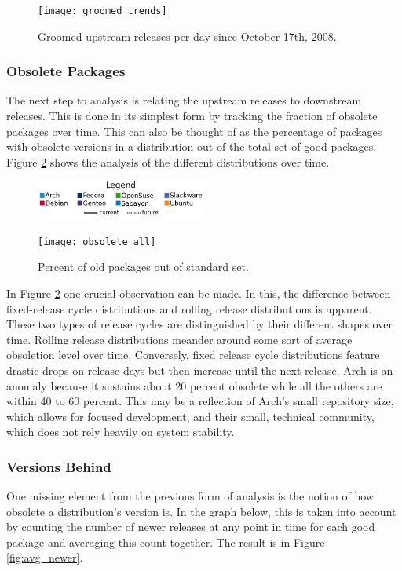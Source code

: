 \documentclass[letterpaper,10pt]{article}
\begin{document}
\begin{figure}[htbp]
\texttt{[image: groomed\_trends]}
\caption{Groomed upstream releases per day since October 17th, 2008.}
\label{fig:groomed_upstream}
\end{figure}

\subsubsection{Obsolete Packages}
The next step to analysis is relating the upstream releases to downstream releases.  This is done in its simplest form by tracking the fraction of obsolete packages over time.  This can also be thought of as the percentage of packages with obsolete versions in a distribution out of the total set of good packages.  Figure \ref{fig:percent_obs} shows the analysis of the different distributions over time.

\begin{figure}[htbp!]
\begin{center}
\includegraphics[width=0.5\textwidth]{legend2}
\end{center}
\texttt{[image: obsolete\_all]}
\caption{Percent of old packages out of standard set.}
\label{fig:percent_obs}
\end{figure}

In Figure \ref{fig:percent_obs} one crucial observation can be made.  In this, the difference between fixed-release cycle distributions and rolling release distributions is apparent.  These two types of release cycles are distinguished by their different shapes over time.  Rolling release distributions meander around some sort of average obsoletion level over time.  Conversely, fixed release cycle distributions feature drastic drops on release days but then increase until the next release.  Arch is an anomaly because it sustains about 20 percent obsolete while all the others are within 40 to 60 percent.  This may be a reflection of Arch's small repository size, which allows for focused development, and their small, technical community, which does not rely heavily on system stability.
\subsubsection{Versions Behind}
One missing element from the previous form of analysis is the notion of how obsolete a distribution's version is.  In the graph below, this is taken into account by counting the number of newer releases at any point in time for each good package and averaging this count together.  The result is in Figure \ref{fig:avg_newer}.
\end{document}
